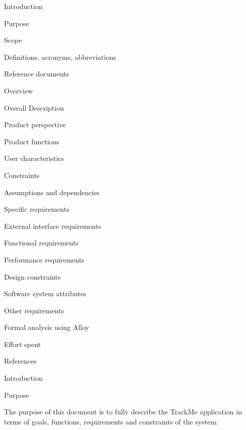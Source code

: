 \documentclass{article}
\begin{document}
	\begin{legal}
 	\item Introduction
  		\begin{legal}
    		\item Purpose
		\item Scope
		\item Definitions, acronyms, abbreviations
		\item Reference documents
		\item Overview	
  		\end{legal}
	\item Overall Description
  		\begin{legal}
    		\item Product perspective
		\item Product functions
		\item User characteristics
		\item Constraints
		\item Assumptions and dependencies
  		\end{legal}
	\item Specific requirements
  		\begin{legal}
    		\item External interface requirements
		\item Functional requirements
		\item Performance requirements
		\item Design constraints
		\item Software system attributes
		\item Other requirements
  		\end{legal}
	\item Formal analysis using Alloy
  	\item Effort spent
	\item References
	\end{legal}
\newpage
	\begin{legal}\bfseries
 	\item {Introduction}
  		\begin{legal}\bfseries
    		\item Purpose
		\end{legal}
	\end{legal}
	The purpose of this document is to fully describe the TrackMe application in terms of goals, functions, requirements and constraints of the system.
	
\end{document}
